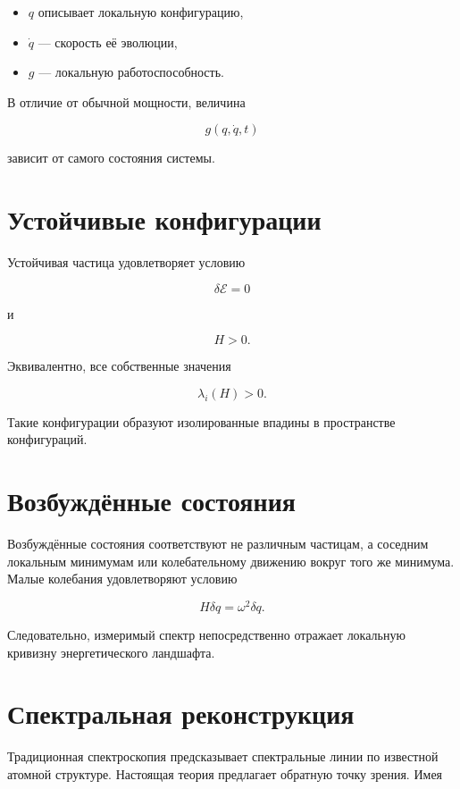 \begin{itemize}

\item $q$ описывает локальную конфигурацию,

\item $\dot q$ — скорость её эволюции,

\item $g$ — локальную работоспособность.

\end{itemize}

В отличие от обычной мощности, величина

\[ g(q,\dot q,t) \]

зависит от самого состояния системы.

\section{Устойчивые конфигурации}

Устойчивая частица удовлетворяет условию

\[ \delta\mathcal E=0 \]

и

\[ H>0. \]

Эквивалентно, все собственные значения

\[ \lambda_i(H) > 0. \]

Такие конфигурации образуют изолированные впадины в пространстве конфигураций.

\section{Возбуждённые состояния}

Возбуждённые состояния соответствуют не различным частицам, а соседним локальным минимумам или колебательному движению вокруг того же минимума. Малые колебания удовлетворяют условию

\[ H \delta q = \omega^2 \delta q. \]

Следовательно, измеримый спектр непосредственно отражает локальную кривизну энергетического ландшафта.

\section{Спектральная реконструкция}

Традиционная спектроскопия предсказывает спектральные линии по известной атомной структуре. Настоящая теория предлагает обратную точку зрения. Имея

